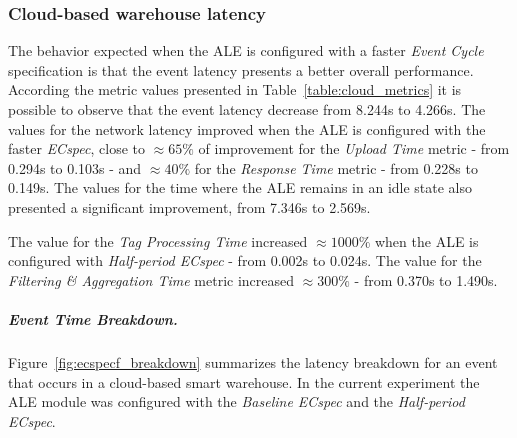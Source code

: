 \subsubsection{Cloud-based warehouse latency}
\label{subs:eval_exp_latency_ecspec_fast}
The behavior expected when the \gls{ALE} is configured with a faster \textit{Event Cycle} specification
is that the event latency presents a better overall performance. According the metric values presented
in Table~\ref{table:cloud_metrics} it is possible to observe that the event latency decrease from 8.244s
to 4.266s. The values for the network latency improved when the \gls{ALE} is configured with the faster
\textit{ECspec}, close to $\approx65\%$ of improvement for the \textit{Upload Time} metric - from 0.294s
to 0.103s - and $\approx40\%$ for the \textit{Response Time} metric - from 0.228s to 0.149s. The
values for the time where the \gls{ALE} remains in an idle state also presented a significant
improvement, from 7.346s to 2.569s.



The value for the \textit{Tag Processing Time} increased $\approx1000\%$ when the \gls{ALE} is configured
with \textit{Half-period ECspec} - from 0.002s to 0.024s. The value for the \textit{Filtering \& Aggregation Time}
metric increased $\approx300\%$ - from 0.370s to 1.490s.

\subparagraph{Event Time Breakdown.}
\label{subp:cloud_event_breakdown}
Figure~\ref{fig:ecspecf_breakdown} summarizes the latency breakdown for an event that occurs in a cloud-based
smart warehouse. In the current experiment the \gls{ALE} module was configured with the
\textit{Baseline ECspec} and the \textit{Half-period ECspec}.\\

